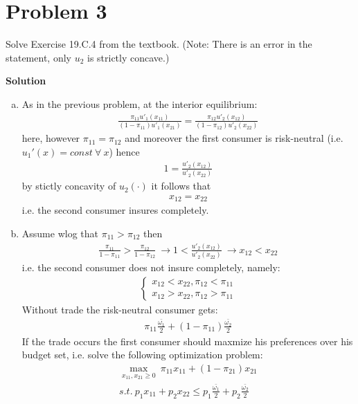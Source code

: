 \documentclass[a4paper]{article}
\begin{document}
\section*{Problem 3}
Solve Exercise 19.C.4 from the textbook. (Note: There is an error in the statement,
only $u_2$ is strictly concave.)


\textbf{Solution}

\begin{enumerate}[(a)]
	\item As in the previous problem, at the interior equilibrium:
	\begin{align*}
	\frac{\pi_{11}u'_1(x_{11})}{(1-\pi_{11})u'_1(x_{21})} = \frac{\pi_{12}u'_2(x_{12})}{(1-\pi_{12})u'_2(x_{22})}
	\end{align*}
	here, however $\pi_{11} = \pi_{12}$ and moreover the first consumer is risk-neutral (i.e. $u_1'(x) = const\ \forall\ x$) hence
	\begin{align*}
	1 = \frac{u'_2(x_{12})}{u'_2(x_{22})}
	\end{align*}
	by stictly concavity of $u_2(\cdot)$ it follows that
	\begin{align*}
	x_{12} = x_{22}
	\end{align*}
	i.e. the second consumer insures completely.
	\item Assume wlog that $\pi_{11} > \pi_{12}$ then
	\begin{align*}
	\frac{\pi_{11}}{1 - \pi_{11}} > \frac{\pi_{12}}{1 - \pi_{12}}\ \to 1 < \frac{u'_2(x_{12})}{u'_2(x_{22})}\ \to x_{12} < x_{22}
	\end{align*}
	i.e. the second consumer does not insure completely, namely:
	\begin{align*}
	\begin{cases}
	x_{12} < x_{22}, \pi_{12} < \pi_{11}\\
	x_{12} > x_{22}, \pi_{12} > \pi_{11}
	\end{cases}
	\end{align*} 
	Without trade the risk-neutral consumer gets:
	\begin{align*}
	\pi_{11} \frac{\bar{\omega_1}}{2} + (1 - \pi_{11})\frac{\bar{\omega_2}}{2}
	\end{align*}
	If the trade occurs the first consumer should maxmize his preferences over his budget set, i.e. solve the following optimization problem:
	\begin{align*}
	\underset{x_{11}, x_{21} \ge 0}{\max}\ \pi_{11}x_{11} + (1 - \pi_{21})x_{21}\\
	s.t.\ p_1x_{11} + p_2x_{22} \le p_1\frac{\bar{\omega_1}}{2} + p_2 \frac{\bar{\omega_2}}{2}

\end{align*}
\end{enumerate}
\end{document}
